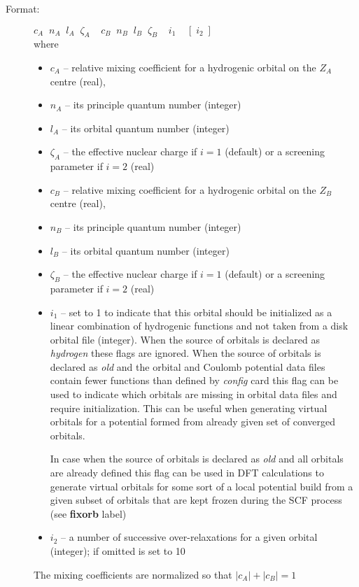 \documentclass[12pt,a4paper]{article}
\newcommand{\fb}[1]{\textbf{#1}}
\begin{document}
\begin{description}
\begin{description}
\begin{description}
\item[Format:] $c_A\;\;n_A \;\;l_A \;\;\zeta_A \;\;\;\;c_B\;\;n_B\;\;l_B\;\;
  \zeta_B\;\;\;\;i_1\;\;\;\;[\;i_2\;]$ \\
where
\begin{itemize}
\item[] $c_A$ -- relative mixing coefficient for a hydrogenic orbital on the
                    $Z_A$ centre (real),
\item[] $n_A$ -- its principle quantum number (integer)
\item[] $l_A$ -- its orbital quantum number (integer)
\item[] $\zeta_A$ -- the effective nuclear charge if $i=1$ (default) or
a screening parameter if $i=2$ (real)
\item[] $c_B$  -- relative mixing coefficient for a hydrogenic orbital on the
                    $Z_B$ centre (real),
\item[] $n_B$ -- its principle quantum number (integer)
\item[] $l_B$ -- its orbital quantum number (integer)
\item[] $\zeta_B$ -- the effective nuclear charge if $i=1$ (default) or
a screening parameter if $i=2$ (real)
\item[] $i_1$ -- set to 1 to indicate that this orbital should be initialized as a linear
  combination of hydrogenic functions and not taken from a disk orbital file (integer). When
  the source of orbitals is declared as \textsl{hydrogen} these flags are ignored.
  When the source of orbitals is declared as \textsl{old} and
  the orbital and Coulomb potential data files contain fewer functions than defined by
  \textsl{config} card this flag can be used to indicate which orbitals are missing in
  orbital data files and require initialization. This can be useful when generating
  virtual orbitals for a potential formed from already given set of converged orbitals.

  In case when the source of orbitals is declared as \textsl{old} and all orbitals are
  already defined this flag can be used in DFT calculations to generate virtual orbitals
  for some sort of a local potential build from a given subset of orbitals that are kept
  frozen during the SCF process (see \fb{fixorb} label)

\item[] $i_2$ -- a number of successive over-relaxations for a given orbital
(integer); if omitted is set to 10
\end{itemize}
The mixing coefficients are normalized so that $|c_A|+|c_B|=1$


\end{description}
\end{description}
\end{description}
\end{document}
